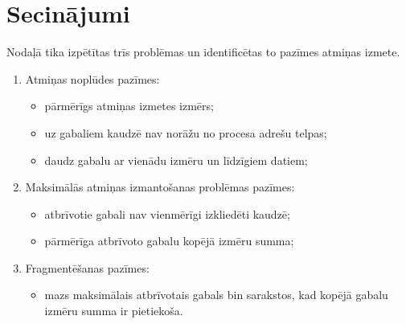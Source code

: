 \section{Secinājumi}
Nodaļā tika izpētītas trīs problēmas un identificētas to pazīmes atmiņas izmete.
\begin{enumerate}
\item Atmiņas noplūdes pazīmes:
    \begin{itemize} \itemsep5pt \parskip5pt 
        \item pārmērīgs atmiņas izmetes izmērs;
        \item uz gabaliem kaudzē nav norāžu no procesa adrešu telpas;
        \item daudz gabalu ar vienādu izmēru un līdzīgiem datiem;
    \end{itemize}
\item Maksimālās atmiņas izmantošanas problēmas pazīmes:
    \begin{itemize} \itemsep5pt \parskip5pt 
        \item atbrīvotie gabali nav vienmērīgi izkliedēti kaudzē;
        \item pārmērīga atbrīvoto gabalu kopējā izmēru summa;
    \end{itemize}
 \item Fragmentēšanas pazīmes:
    \begin{itemize} \itemsep5pt \parskip5pt 
        \item mazs maksimālais atbrīvotais gabals bin sarakstos, kad kopējā gabalu izmēru summa ir pietiekoša.
    \end{itemize}
\end{enumerate}



